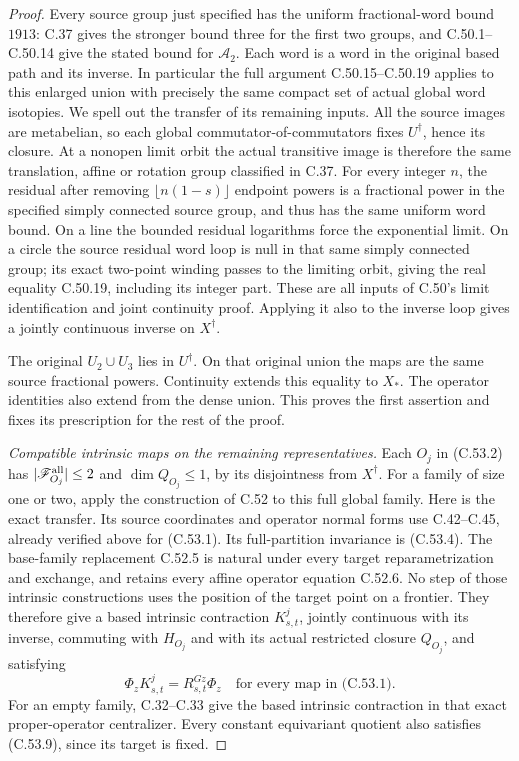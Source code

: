 \begin{proof}
Every source group just specified has the uniform
fractional-word bound $1913$: C.37 gives the stronger
bound three for the first two groups, and C.50.1--C.50.14
give the stated bound for $\mathcal A_2$.
Each word is a word in the original based path and
its inverse. In particular the full argument
C.50.15--C.50.19 applies to this enlarged union with
precisely the same compact set of actual global word
isotopies. We spell out the transfer of its remaining
inputs. All the source images are metabelian, so
each global commutator-of-commutators fixes
$U^\dagger$, hence its closure. At a nonopen limit
orbit the actual transitive image is therefore the
same translation, affine or rotation group classified
in C.37. For every integer $n$, the residual after
removing $\lfloor n(1-s)\rfloor$ endpoint powers is a
fractional power in the specified simply connected
source group, and thus has the same uniform word
bound. On a line the bounded residual logarithms
force the exponential limit. On a circle the source
residual word loop is null in that same simply
connected group; its exact two-point winding passes
to the limiting orbit, giving the real equality
C.50.19, including its integer part. These are all
inputs of C.50's limit identification and joint
continuity proof. Applying it also to the inverse
loop gives a jointly continuous inverse on
$X^\dagger$.

The original $U_2\cup U_3$ lies in $U^\dagger$.
On that original union the maps are the same
source fractional powers. Continuity extends this
equality to $X_*$. The operator identities also
extend from the dense union. This proves the first
assertion and fixes its prescription for the rest
of the proof.

\emph{Compatible intrinsic maps on the remaining representatives.}
Each $O_j$ in (C.53.2) has
$|\mathscr F_{O_j}^{\rm all}|\leq2$ and
$\dim Q_{O_j}\leq1$, by its disjointness from
$X^\dagger$. For a family of size one or two,
apply the construction of C.52 to this full global
family. Here is the exact transfer. Its source
coordinates and operator normal forms use
C.42--C.45, already verified above for (C.53.1).
Its full-partition invariance is (C.53.4).
The base-family replacement C.52.5 is natural under
every target reparametrization and exchange, and
retains every affine operator equation C.52.6.
No step of those intrinsic constructions uses the
position of the target point on a frontier.
They therefore give a based intrinsic contraction
$K^j_{s,t}$, jointly continuous with its inverse,
commuting with $H_{O_j}$ and with its actual
restricted closure $Q_{O_j}$, and satisfying
\[
                    \Phi_z K^j_{s,t}
                             =R^{Gz}_{s,t}\Phi_z
                 \quad\text{for every map in (C.53.1)}.
                                                        \tag{C.53.9}
\]
For an empty family, C.32--C.33 give the based
intrinsic contraction in that exact proper-operator
centralizer. Every constant equivariant quotient
also satisfies (C.53.9), since its target is fixed.


\end{proof}

